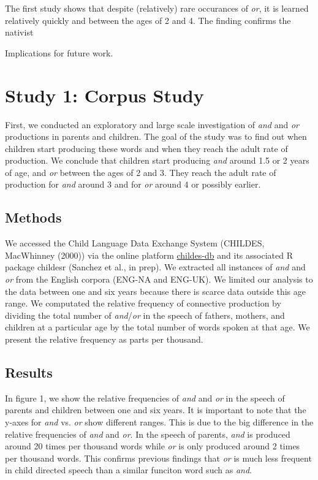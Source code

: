 \documentclass[10pt, letterpaper]{article}
\begin{document}
The first study shows that despite (relatively) rare occurances of
\emph{or}, it is learned relatively quickly and between the ages of 2
and 4. The finding confirms the nativist

Implications for future work.

\section{Study 1: Corpus Study}\label{study-1-corpus-study}

First, we conducted an exploratory and large scale investigation of
\emph{and} and \emph{or} productions in parents and children. The goal
of the study was to find out when children start producing these words
and when they reach the adult rate of production. We conclude that
children start producing \emph{and} around 1.5 or 2 years of age, and
\emph{or} between the ages of 2 and 3. They reach the adult rate of
production for \emph{and} around 3 and for \emph{or} around 4 or
possibly earlier.

\subsection{Methods}\label{methods}

We accessed the Child Language Data Exchange System (CHILDES, MacWhinney
(2000)) via the online platform
\href{http://childes-db.stanford.edu/}{childes-db} and its associated R
package childesr (Sanchez et al., in prep). We extracted all instances
of \emph{and} and \emph{or} from the English corpora (ENG-NA and
ENG-UK). We limited our analysis to the data between one and six years
because there is scarce data outside this age range. We computated the
relative frequency of connective production by dividing the total number
of \emph{and}/\emph{or} in the speech of fathers, mothers, and children
at a particular age by the total number of words spoken at that age. We
present the relative frequency as parts per thousand.

\subsection{Results}\label{results}

In figure 1, we show the relative frequencies of \emph{and} and
\emph{or} in the speech of parents and children between one and six
years. It is important to note that the y-axes for \emph{and} vs.
\emph{or} show different ranges. This is due to the big difference in
the relative frequencies of \emph{and} and \emph{or}. In the speech of
parents, \emph{and} is produced around 20 times per thousand words while
\emph{or} is only produced around 2 times per thousand words. This
confirms previous findings that \emph{or} is much less frequent in child
directed speech than a similar funciton word such as \emph{and}.
\end{document}
